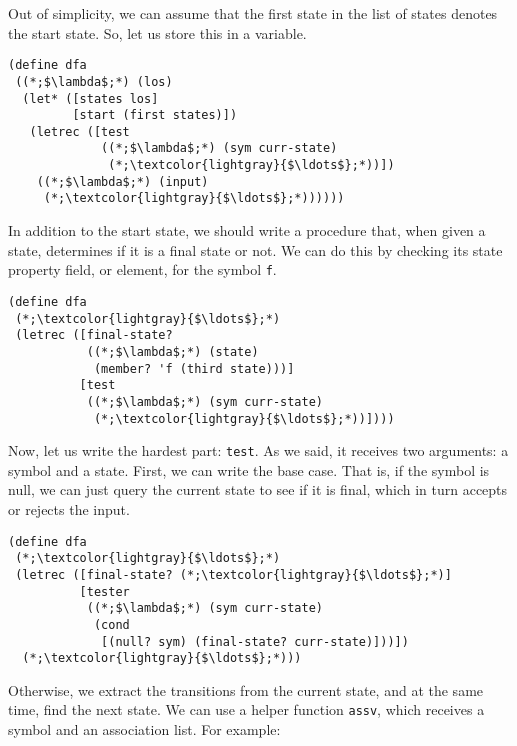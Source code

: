 Out of simplicity, we can assume that the first state in the list of states denotes the start state. So, let us store this in a variable.

\begin{cl}[]{}\begin{lstlisting}[language=MyScheme]
(define dfa
 ((*;$\lambda$;*) (los)
  (let* ([states los]
         [start (first states)])
   (letrec ([test 
             ((*;$\lambda$;*) (sym curr-state)
              (*;\textcolor{lightgray}{$\ldots$};*))])
    ((*;$\lambda$;*) (input)
     (*;\textcolor{lightgray}{$\ldots$};*))))))
\end{lstlisting}\end{cl}

In addition to the start state, we should write a procedure that, when given a state, determines if it is a final state or not. We can do this by checking its state property field, or element, for the symbol \texttt{\textquotesingle{}f}.

\begin{cl}[]{}\begin{lstlisting}[language=MyScheme]
(define dfa
 (*;\textcolor{lightgray}{$\ldots$};*)
 (letrec ([final-state?
           ((*;$\lambda$;*) (state)
            (member? 'f (third state)))]
          [test 
           ((*;$\lambda$;*) (sym curr-state)
            (*;\textcolor{lightgray}{$\ldots$};*))])))
\end{lstlisting}\end{cl}

Now, let us write the hardest part: \texttt{test}. As we said, it receives two arguments: a symbol and a state. First, we can write the base case. That is, if the symbol is null, we can just query the current state to see if it is final, which in turn accepts or rejects the input.

\begin{cl}[]{}\begin{lstlisting}[language=MyScheme]
(define dfa
 (*;\textcolor{lightgray}{$\ldots$};*)
 (letrec ([final-state? (*;\textcolor{lightgray}{$\ldots$};*)]
          [tester 
           ((*;$\lambda$;*) (sym curr-state)
            (cond
             [(null? sym) (final-state? curr-state)]))])
  (*;\textcolor{lightgray}{$\ldots$};*)))
\end{lstlisting}\end{cl}

Otherwise, we extract the transitions from the current state, and at the same time, find the next state. We can use a helper function \texttt{assv}, which receives a symbol and an association list. For example:

